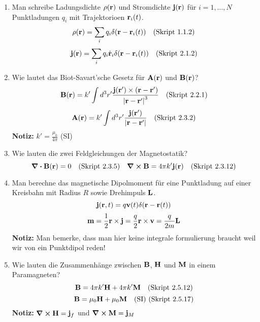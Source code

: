 \documentclass{scrartcl}
\newcommand{\rr}[1]{\frac{#1}{\abs{\vb{r}-\vb{r}'}}}
\newcommand{\ds}{\displaystyle}
\newcommand{\smref}[1]{\quad\text{(Skript #1)}}
\begin{document}
\begin{enumerate}
    \item Man schreibe Ladungsdichte $\rho(\vb r)$ und Stromdichte
          $\vb j(\vb r)$ für $i=1,\ldots,N$ Punktladungen $q_i$ mit 
          Trajektorioen $\vb r_i(t)$.
          $$\rho(\vb r)=\sum_i q_i\delta(\vb r-\vb r_i(t))
          \quad \text{(Skript 1.1.2)}$$
          $$\vb j(\vb r)=\sum_i q_i\dot{\vb r}_i\delta(\vb r-\vb r_i(t))
          \quad \text{(Skript 2.1.2)}$$

    \item Wie lautet das Biot-Savart'sche Gesetz für $\vb A(\vb r)$ und
          $\vb B(\vb r)$?
          $$\vb B(\vb r)=k'\int d^3r'\frac{\vb j(\vb r')\times
          (\vb r-\vb r')}{\abs{\vb r-\vb r'}^3}
          \quad \text{(Skript 2.2.1)}$$
          $$\vb A(\vb r)=k'\int d^3r'\rr{\vb j(\vb r')}
          \quad \text{(Skript 2.3.2)}$$
          \textbf{Notiz:} $k'=\frac{\mu_0}{4\pi}$ (SI)

    \item Wie lauten die zwei Feldgleichungen der Magnetostatik?
      $$\div \vb B(\vb r) = 0\smref{2.3.5}
      \quad \curl \vb B= 4\pi k'\vb j(\vb r)\smref{2.3.12}$$

    \item Man berechne das magnetische Dipolmoment für eine Punktladung auf
          einer Kreisbahn mit Radius $R$ sowie Drehimpuls $\vb L$.
          $$\vb j(\vb r,t)=q\vb v(t)\delta(\vb r-\vb r(t))$$
          $$\vb m = \frac{1}{2}\vb r \times \vb j=\frac{q}{2}\vb 
          r\times\vb v=\frac{q}{2m}\vb L$$
          \textbf{Notiz:} Man bemerke, dass man hier keine integrale 
          formulierung braucht weil wir von ein Punktdipol reden!

    \item Wie lauten die Zusammenhänge zwischen $\vb B$, $\vb H$ 
          und $\vb M$ in einem Paramagneten?
          $$\vb B = 4\pi k'\vb H + 4\pi k'\vb M\quad\text{(Skript 2.5.12)}$$
          $$\vb B = \mu_0 \vb H + \mu_0 \vb M \quad\text{(SI) 
          (Skript 2.5.17)}$$
          \textbf{Notiz:} $\ds \curl \vb H = \vb j_f$ und 
          $\ds \curl \vb M=\vb j_M$ 

  \end{enumerate}

  \newpage
\end{document}

